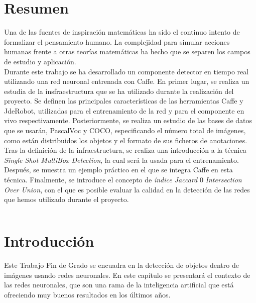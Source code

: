 \documentclass[a4paper, 12pt, oneside]{book}
\begin{document}
\chapter*{Resumen} %
\thispagestyle{empty}

Una de las fuentes de inspiración matemáticas ha sido el continuo intento de formalizar el pensamiento humano. La complejidad para simular acciones humanas frente a otras teorías matemáticas ha hecho que se separen los campos de estudio y aplicación.\\

Durante este trabajo se ha desarrollado un componente detector en tiempo real utilizando una red neuronal entrenada con Caffe. En primer lugar, se realiza un estudia de la insfraestructura que se ha utilizado durante la realización del proyecto. Se definen las principales características de las herramientas Caffe y JdeRobot, utilizadas para el entrenamiento de la red y para el componente en vivo respectivamente. Posteriormente, se realiza un estudio de las bases de datos que se usarán, PascalVoc y COCO, especificando el número total de imágenes, como están distribuidos los objetos y el formato de sus ficheros de anotaciones. Tras la definición de la infraestructura, se realiza una introducción a la técnica \textit{Single Shot MultiBox Detection}, la cual será la usada para el entrenamiento. Después, se muestra un ejemplo práctico en el que se integra Caffe en esta técnica. Finalmente, se introduce el concepto de \textit{índice Jaccard} 0 \textit{Intersection Over Union}, con el que es posible evaluar la calidad en la detección de las redes que hemos utilizado durante el proyecto.

\newpage
$\ $
\thispagestyle{empty} 

\tableofcontents
\thispagestyle{empty}
\cleardoublepage


\listoffigures
{}
\thispagestyle{empty}
\cleardoublepage


\cleardoublepage
\printglossaries
{}
\printglossary[type=\acronymtype]

 
\chapter{Introducción}

Este Trabajo Fin de Grado se encuadra en la detección de objetos dentro de imágenes usando redes neuronales. En este capítulo se presentará el contexto de las redes neuronales, que son una rama de la inteligencia artificial que está ofreciendo muy buenos resultados en los últimos años.\\
\end{document}
